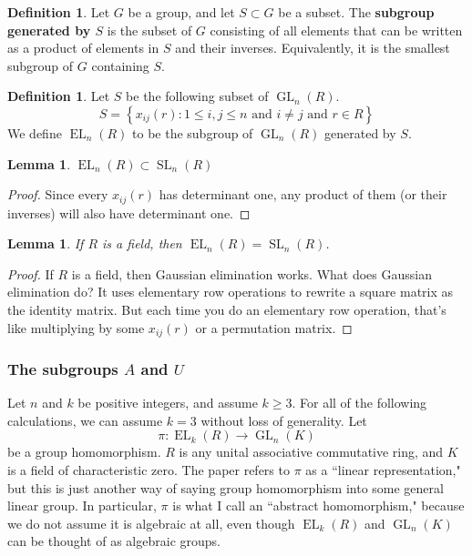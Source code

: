 \documentclass[12pt]{article}
\newtheorem{lemma}[theorem]{Lemma}
\theoremstyle{definition}
\newtheorem{definition}[theorem]{Definition}
\newcommand{\lb}{\left\{}
\newcommand{\rb}{\right\}}
\newcommand{\tbf}{\textbf}
\DeclareMathOperator{\EL}{EL}
\DeclareMathOperator{\SL}{SL}
\DeclareMathOperator{\GL}{GL}
\begin{document}
\begin{definition}
Let $G$ be a group, and let $S \subset G$ be a subset. The \tbf{subgroup generated by $S$} is the subset of $G$ consisting of all elements that can be written as a product of elements in $S$ and their inverses. Equivalently, it is the smallest subgroup of $G$ containing $S$.
\end{definition}

\begin{definition}
Let $S$ be the following subset of $\GL_n(R)$.
\[
	S = \lb x_{ij}(r) : 1 \le i,j \le n \text{ and } i \neq j \text{ and } r \in R \rb
\]
We define $\EL_n(R)$ to be the subgroup of $\GL_n(R)$ generated by $S$.
\end{definition}

\begin{lemma}
$\EL_n(R) \subset \SL_n(R)$
\end{lemma}
\begin{proof}
Since every $x_{ij}(r)$ has determinant one, any product of them (or their inverses) will also have determinant one.
\end{proof}

\begin{lemma}
If $R$ is a field, then $\EL_n(R) = \SL_n(R)$.
\end{lemma}
\begin{proof}
If $R$ is a field, then Gaussian elimination works. What does Gaussian elimination do? It uses elementary row operations to rewrite a square matrix as the identity matrix. But each time you do an elementary row operation, that's like multiplying by some $x_{ij}(r)$ or a permutation matrix.
\end{proof}

\subsubsection*{The subgroups $A$ and $U$}

Let $n$ and $k$ be positive integers, and assume $k \ge 3$. For all of the following calculations, we can assume $k=3$ without loss of generality. Let 
\[
	\pi:\EL_k(R) \to \GL_n(K)
\]
be a group homomorphism. $R$ is any unital associative commutative ring, and $K$ is a field of characteristic zero. The paper refers to $\pi$ as a ``linear representation," but this is just another way of saying group homomorphism into some general linear group. In particular, $\pi$ is what I call an ``abstract homomorphism," because we do not assume it is algebraic at all, even though $\EL_k(R)$ and $\GL_n(K)$ can be thought of as algebraic groups.
\end{document}

